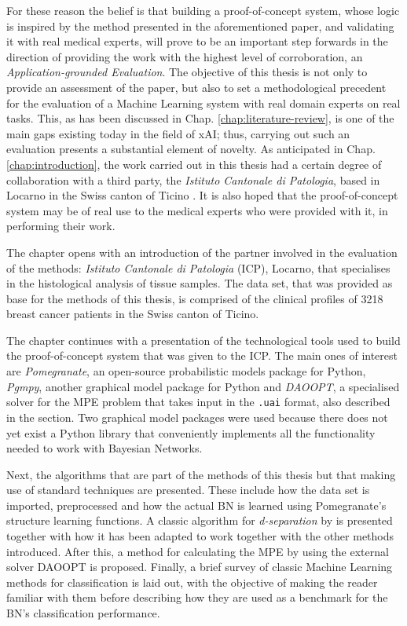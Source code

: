 \documentclass[mscthesis]{usiinfthesis}
\begin{document}
 For these reason the belief is that building a proof-of-concept system, whose logic is inspired by the method presented in the aforementioned paper, and validating it with real medical experts, will prove to be an important step forwards in the direction of providing the work with the highest level of corroboration, an \textit{Application-grounded Evaluation}.
 The objective of this thesis is not only to provide an assessment of the paper, but also to set a methodological precedent for the evaluation of a Machine Learning system with real domain experts on real tasks.
 This, as has been discussed in Chap. \ref{chap:literature-review}, is one of the main gaps existing today in the field of xAI; thus, carrying out such an evaluation presents a substantial element of novelty.
 As anticipated in Chap. \ref{chap:introduction}, the work carried out in this thesis had a certain degree of collaboration with a third party, the \textit{Istituto Cantonale di Patologia}, based in Locarno in the Swiss canton of Ticino \cite{istitutocantonalepresentazione}.
It is also hoped that the proof-of-concept system may be of real use to the medical experts who were provided with it, in performing their work.
 
 The chapter opens with an introduction of the partner involved in the evaluation of the methods: \textit{Istituto Cantonale di Patologia} (ICP), Locarno, that specialises in the histological analysis of tissue samples.
 The data set, that was provided as base for the methods of this thesis, is comprised of the clinical profiles of 3218 breast cancer patients in the Swiss canton of Ticino.
 
 The chapter continues with a presentation of the technological tools used to build the proof-of-concept system that was given to the ICP.
 The main ones of interest are \textit{Pomegranate}, an open-source probabilistic models package for Python, \textit{Pgmpy}, another graphical model package for Python and \textit{DAOOPT}, a specialised solver for the MPE problem that takes input in the \texttt{.uai} format, also described in the section.
 Two graphical model packages were used because there does not yet exist a Python library that conveniently implements all the functionality needed to work with Bayesian Networks.
 
 Next, the algorithms that are part of the methods of this thesis but that making use of standard techniques are presented.
 These include how the data set is imported, preprocessed and how the actual BN is learned using Pomegranate's structure learning functions.
 A classic algorithm for \textit{d-separation} by \cite{koller2007dseparation} is presented together with how it has been adapted to work together with the other methods introduced.
 After this, a method for calculating the MPE by using the external solver DAOOPT is proposed.
 Finally, a brief survey of classic Machine Learning methods for classification is laid out, with the objective of making the reader familiar with them before describing how they are used as a benchmark for the BN's classification performance.
 
\end{document}
